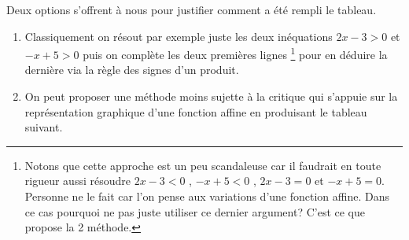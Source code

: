 \documentclass[12pt,a4paper]{article}
\theoremstyle{definition}
\begin{document}
\begin{center}
\end{center}

Deux options s'offrent à nous pour justifier comment a été rempli le tableau.

\begin{enumerate}
    \item Classiquement on résout par exemple juste les deux inéquations $2 x - 3 > 0$ et $-x + 5 > 0$ puis on complète les deux premières lignes
    \footnote{
        Notons que cette approche est un peu scandaleuse car il faudrait en toute rigueur aussi résoudre
        $2 x - 3 < 0$ , $-x + 5 < 0$ , $2 x - 3 = 0$ et $-x + 5 = 0$.
        Personne ne le fait car l'on pense aux variations d'une fonction affine. Dans ce cas pourquoi ne pas juste utiliser ce dernier argument?
        C'est ce que propose la 2\ieme{} méthode.
    }
    pour en déduire la dernière via la règle des signes d'un produit.

    \item On peut proposer une méthode moins sujette à la critique qui s'appuie sur la représentation graphique d'une fonction affine en produisant le tableau suivant.
\end{enumerate}
\end{document}
